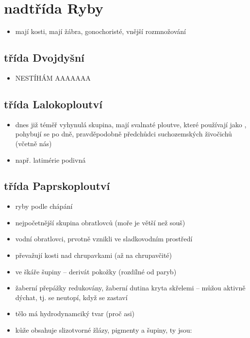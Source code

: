 \documentclass{article}
\begin{document}
\section{nadtřída Ryby}
\begin{itemize}
  \item mají kosti, mají žábra, gonochoristé, vnější rozmnožování
\end{itemize}

\subsection{třída Dvojdyšní}%
\begin{itemize}
  \item NESTÍHÁM AAAAAAA
\end{itemize}

\subsection{třída Lalokoploutví}
\begin{itemize}
  \item dnes již téměř vyhynulá skupina, mají svalnaté ploutve, které používají jako , pohybují se po dně, pravděpodobně předchůdci suchozemských živočichů (včetně nás)
  \item např. latimérie podivná
\end{itemize}

\subsection{třída Paprskoploutví}
\begin{itemize}
  \item ryby podle  chápání
  \item nejpočetnější skupina obratlovců (moře je větší než souš)
  \item vodní obratlovci, prvotně vznikli ve sladkovodním prostředí
  \item převažují kosti nad chrupavkami (až na chrupavčité)
  \item ve škáře šupiny -- derivát pokožky (rozdílné od paryb)
  \item žaberní přepážky redukovány, žaberní dutina kryta skřelemi -- můžou aktivně dýchat, tj. se neutopí, když se zastaví
  \item tělo má hydrodynamciký tvar (proč asi)
  \item kůže obsahuje slizotvorné žlázy, pigmenty a šupiny, ty jsou:
\end{itemize}
\end{document}
